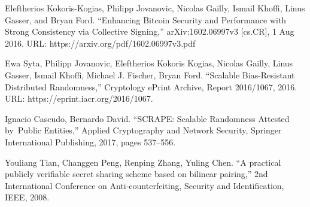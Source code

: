 \documentclass[a4paper, 10pt, conference]{ieeeconf}
\begin{document}
\begin{thebibliography}{99}
 Eleftherios Kokoris-Kogias, Philipp Jovanovic, Nicolas Gailly,
Ismail Khoffi, Linus Gasser, and Bryan Ford. ``Enhancing Bitcoin Security and Performance with Strong Consistency via Collective Signing,'' arXiv:1602.06997v3 [cs.CR], 1 Aug 2016. URL: https://arxiv.org/pdf/1602.06997v3.pdf

 Ewa Syta, Philipp Jovanovic, Eleftherios Kokoris Kogias, Nicolas Gailly, Linus Gasser, Ismail Khoffi, Michael J. Fischer, Bryan Ford. ``Scalable Bias-Resistant Distributed Randomness,'' Cryptology ePrint Archive, Report 2016/1067, 2016. URL: https://eprint.iacr.org/2016/1067.

 Ignacio Cascudo, Bernardo David. ``SCRAPE: Scalable Randomness Attested by Public Entities,'' Applied Cryptography and Network Security, Springer International Publishing, 2017, pages 537--556.

 Youliang Tian, Changgen Peng, Renping Zhang, Yuling Chen. ``A practical publicly verifiable secret sharing scheme based on bilinear pairing,'' 2nd International Conference on Anti-counterfeiting, Security and Identification, IEEE, 2008.

\end{thebibliography}
\end{document}
